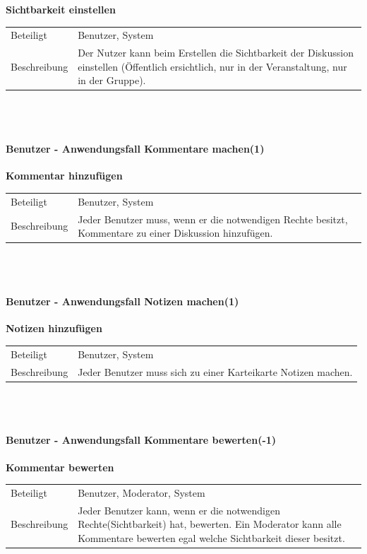 \documentclass[12pt,a4paper]{article}
\begin{document}
\textbf{Sichtbarkeit einstellen}\\
\begin{tabular}{l|p{12cm}}
	\hline 
	Beteiligt & Benutzer, System \\ 
	Beschreibung & Der Nutzer kann beim Erstellen die Sichtbarkeit der Diskussion einstellen (Öffentlich ersichtlich, nur in der Veranstaltung, nur in der Gruppe). \\ 
\end{tabular}\\\\


\paragraph{Benutzer - Anwendungsfall \glqq Kommentare machen\grqq (1)}\mbox{}

\textbf{Kommentar hinzufügen}\\
\begin{tabular}{l|p{12cm}}
	\hline 
	Beteiligt & Benutzer, System \\ 
	Beschreibung & Jeder Benutzer muss, wenn er die notwendigen Rechte besitzt, Kommentare zu einer Diskussion hinzufügen. \\ 
\end{tabular}\\\\ 


\paragraph{Benutzer - Anwendungsfall \glqq Notizen machen\grqq (1)}\mbox{}

\textbf{Notizen hinzufügen}\\
\begin{tabular}{l|p{12cm}}
	\hline 
	Beteiligt & Benutzer, System \\ 
	Beschreibung & Jeder Benutzer muss sich zu einer Karteikarte Notizen machen. \\ 
\end{tabular}\\\\


\paragraph{Benutzer - Anwendungsfall \glqq Kommentare bewerten\grqq (-1)}\mbox{}

\textbf{Kommentar bewerten}\\
\begin{tabular}{l|p{12cm}}
	\hline 
	Beteiligt & Benutzer, Moderator, System \\ 
	Beschreibung & Jeder Benutzer kann, wenn er die notwendigen Rechte(Sichtbarkeit) hat, bewerten. Ein Moderator kann alle Kommentare  bewerten egal welche Sichtbarkeit dieser besitzt. \\ 
\end{tabular}\\\\
\end{document}
